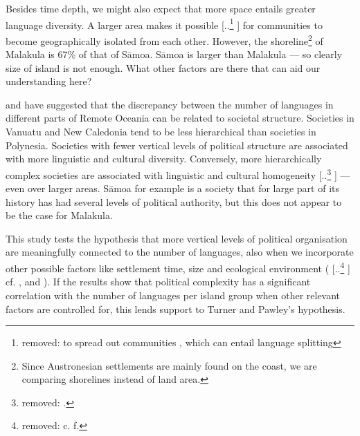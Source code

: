 \documentclass[unnumsec,webpdf,modern,medium]{oup-authoring-template}
\providecommand{\DIFaddtex}[1]{{\protect\color{blue} \sf #1}} %
\providecommand{\DIFdeltex}[1]{{\protect\color{red} [..\footnote{removed: #1} ]}} %
\providecommand{\DIFaddbegin}{} %
\providecommand{\DIFaddend}{} %
\providecommand{\DIFdelbegin}{} %
\providecommand{\DIFdelend}{} %
\providecommand{\DIFadd}[1]{\texorpdfstring{\DIFaddtex{#1}}{#1}} %
\providecommand{\DIFdel}[1]{\texorpdfstring{\DIFdeltex{#1}}{}} %
\newcommand{\DIFscaledelfig}{0.5}
\newlength{\DIFdelgraphicswidth} %
\newlength{\DIFdelgraphicsheight} %
\newcommand{\DIFaddincludegraphics}[2][]{{\color{blue}\fbox{\DIFOincludegraphics[#1]{#2}}}} %
\newcommand{\DIFdelincludegraphics}[2][]{%
\sbox{\DIFdelgraphicsbox}{\DIFOincludegraphics[#1]{#2}}%
\settoboxwidth{\DIFdelgraphicswidth}{\DIFdelgraphicsbox} %
\settoboxtotalheight{\DIFdelgraphicsheight}{\DIFdelgraphicsbox} %
\scalebox{\DIFscaledelfig}{%
\parbox[b]{\DIFdelgraphicswidth}{\usebox{\DIFdelgraphicsbox}\\[-\baselineskip] \rule{\DIFdelgraphicswidth}{0em}}\llap{\resizebox{\DIFdelgraphicswidth}{\DIFdelgraphicsheight}{%
\setlength{\unitlength}{\DIFdelgraphicswidth}%
\begin{picture}(1,1)%
\thicklines\linethickness{2pt} %
{\color[rgb]{1,0,0}\put(0,0){\framebox(1,1){}}}%
{\color[rgb]{1,0,0}\put(0,0){\line( 1,1){1}}}%
{\color[rgb]{1,0,0}\put(0,1){\line(1,-1){1}}}%
\end{picture}%
}\hspace*{3pt}}} %
} %
\DeclareRobustCommand{\DIFaddbegin}{\DIFOaddbegin \let\includegraphics\DIFaddincludegraphics} %
\DeclareRobustCommand{\DIFaddend}{\DIFOaddend \let\includegraphics\DIFOincludegraphics} %
\DeclareRobustCommand{\DIFdelbegin}{\DIFOdelbegin \let\includegraphics\DIFdelincludegraphics} %
\DeclareRobustCommand{\DIFdelend}{\DIFOaddend \let\includegraphics\DIFOincludegraphics} %
\begin{document}
Besides time depth, we might also expect that more space entails greater language diversity. A larger area makes it possible \DIFdelbegin \DIFdel{to spread out communities , which can entail language splitting}\DIFdelend \DIFaddbegin \DIFadd{for communities to become geographically isolated from each other}\DIFaddend . However, the shoreline\footnote{Since Austronesian settlements are mainly found on the coast, we are comparing shorelines instead of land area.} of Malakula is 67\% of that of S\={a}moa. S\={a}moa is larger than Malakula \DIFaddbegin \DIFadd{--- so clearly size of island is not enough}\DIFaddend . What other factors are there that can aid our understanding here?

\citet{turner1884} and \citet{pawley81,pawley2007} have suggested that the discrepancy between the number of languages in different parts of Remote Oceania can be related to societal structure. Societies in Vanuatu and New Caledonia tend to be less hierarchical than societies in Polynesia. Societies with fewer vertical levels of political structure are associated with more linguistic and cultural diversity. Conversely, more hierarchically complex societies are associated with linguistic and cultural homogeneity \DIFdelbegin \DIFdel{.
}\DIFdelend \DIFaddbegin \DIFadd{--- even over larger areas. S\={a}moa for example is a society that for large part of its history has had several levels of political authority, but this does not appear to be the case for Malakula.
}\DIFaddend 


This study tests the hypothesis that more vertical levels of political organisation are meaningfully connected to the number of languages, also when we incorporate other possible factors like settlement time, size and ecological environment (\DIFdelbegin \DIFdel{c. f. }\DIFdelend \DIFaddbegin \DIFadd{cf. }\DIFaddend \citet{NETTLE1998}, \citet{gavin2012island} and \citet{hua2019ecological}). If the results show that political complexity has a significant correlation with the number of languages per island group when other relevant factors are controlled for, this lends support to Turner and Pawley's hypothesis.
\end{document}
